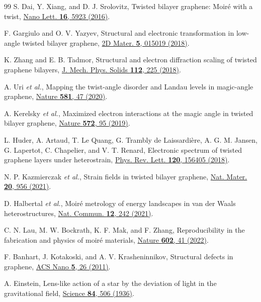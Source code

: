 \documentclass[prb,twocolumn,superscriptaddress,floatfix,10pt]{revtex4-2}
\begin{document}
\begin{thebibliography}{99}
 S. Dai, Y. Xiang, and D. J. Srolovitz, Twisted bilayer graphene: Moir\'e with a twist, \href{https://doi.org/10.1021/acs.nanolett.6b02870}{Nano Lett. \textbf{16}, 5923 (2016)}.

 F. Gargiulo and O. V. Yazyev, Structural and electronic transformation in low-angle twisted bilayer graphene, \href{https://doi.org/10.1088/2053-1583/aa9640}{2D Mater. \textbf{5}, 015019 (2018)}.

 K. Zhang and E. B. Tadmor, Structural and electron diffraction scaling of twisted graphene bilayers, \href{https://doi.org/10.1016/j.jmps.2017.12.005}{J. Mech. Phys. Solids \textbf{112}, 225 (2018)}.

 A. Uri \emph{et al.}, Mapping the twist-angle disorder and Landau levels in magic-angle graphene, \href{https://doi.org/10.1038/s41586-020-2255-3}{Nature \textbf{581}, 47 (2020)}.

 A. Kerelsky \emph{et al.}, Maximized electron interactions at the magic angle in twisted bilayer graphene, \href{https://doi.org/10.1038/s41586-019-1431-9}{Nature \textbf{572}, 95 (2019)}.

 L. Huder, A. Artaud, T. Le Quang, G. Trambly de Laissardi\`ere, A. G. M. Jansen, G. Lapertot, C. Chapelier, and V. T. Renard, Electronic spectrum of twisted graphene layers under heterostrain, \href{https://doi.org/10.1103/PhysRevLett.120.156405}{Phys. Rev. Lett. \textbf{120}, 156405 (2018)}.

 N. P. Kazmierczak \emph{et al.}, Strain fields in twisted bilayer graphene, \href{https://doi.org/10.1038/s41563-021-00973-w}{Nat. Mater. \textbf{20}, 956 (2021)}.

 D. Halbertal \emph{et al.}, Moir\'e metrology of energy landscapes in van der Waals heterostructures, \href{https://doi.org/10.1038/s41467-020-20428-1}{Nat. Commun. \textbf{12}, 242 (2021)}.

 C. N. Lau, M. W. Bockrath, K. F. Mak, and F. Zhang, Reproducibility in the fabrication and physics of moir\'e materials, \href{https://doi.org/10.1038/s41586-021-04173-z}{Nature \textbf{602}, 41 (2022)}.

 F. Banhart, J. Kotakoski, and A. V. Krasheninnikov, Structural defects in graphene, \href{https://doi.org/10.1021/nn102598m}{ACS Nano \textbf{5}, 26 (2011)}.

 A. Einstein, Lens-like action of a star by the deviation of light in the gravitational field, \href{https://doi.org/10.1126/science.84.2188.506}{Science \textbf{84}, 506 (1936)}.


\end{thebibliography}
\end{document}
